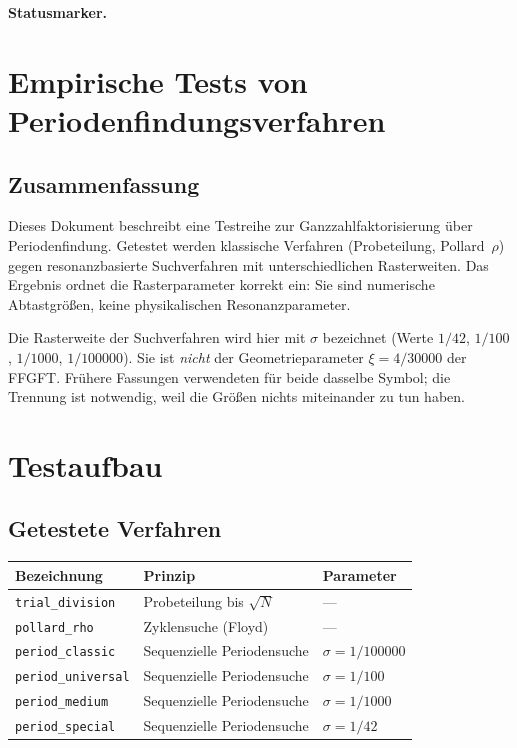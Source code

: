 
\medskip\noindent\textbf{Statusmarker.}


\section{Empirische Tests von Periodenfindungsverfahren}

\subsection*{Zusammenfassung}

Dieses Dokument beschreibt eine Testreihe zur Ganzzahlfaktorisierung über
Periodenfindung. Getestet werden klassische Verfahren (Probeteilung,
Pollard~$\rho$) gegen resonanzbasierte Suchverfahren mit unterschiedlichen
Rasterweiten. Das Ergebnis ordnet die Rasterparameter korrekt ein: Sie sind
numerische Abtastgrößen, keine physikalischen Resonanzparameter.

\begin{keyresult}
Die Rasterweite der Suchverfahren wird hier mit $\sigma$ bezeichnet
(Werte $1/42$, $1/100$, $1/1000$, $1/100000$). Sie ist \emph{nicht} der
Geometrieparameter $\xi = 4/30000$ der FFGFT. Frühere Fassungen verwendeten
für beide dasselbe Symbol; die Trennung ist notwendig, weil die Größen nichts
miteinander zu tun haben.
\end{keyresult}

\section{Testaufbau}

\subsection{Getestete Verfahren}

\begin{center}
\begin{tabular}{lll}
\toprule
Bezeichnung & Prinzip & Parameter \\
\midrule
\texttt{trial\_division} & Probeteilung bis $\sqrt{N}$ & --- \\
\texttt{pollard\_rho} & Zyklensuche (Floyd) & --- \\
\texttt{period\_classic} & Sequenzielle Periodensuche & $\sigma = 1/100000$ \\
\texttt{period\_universal} & Sequenzielle Periodensuche & $\sigma = 1/100$ \\
\texttt{period\_medium} & Sequenzielle Periodensuche & $\sigma = 1/1000$ \\
\texttt{period\_special} & Sequenzielle Periodensuche & $\sigma = 1/42$ \\
\bottomrule
\end{tabular}
\end{center}

